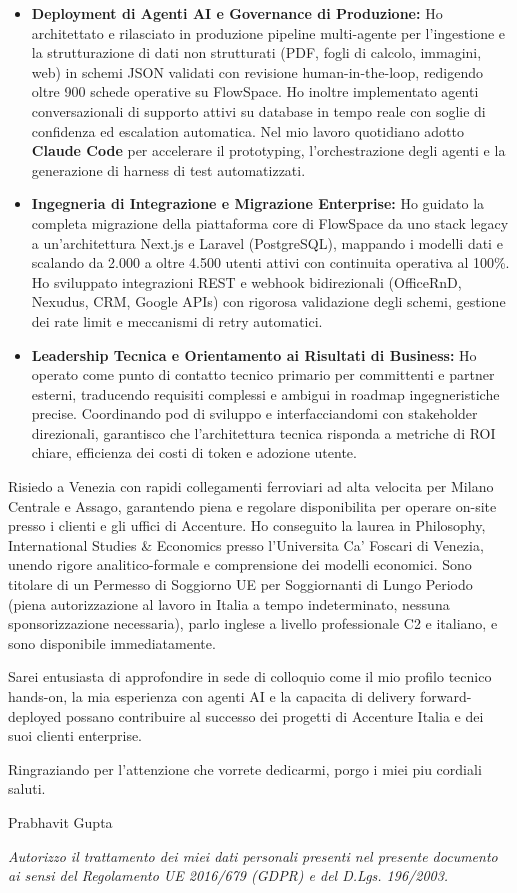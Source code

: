 \documentclass[10.5pt,a4paper]{article}
\begin{document}
\begin{itemize}
  \setlength{\itemsep}{1.5pt}
  \setlength{\parskip}{0pt}
  \item \textbf{Deployment di Agenti AI e Governance di Produzione:} Ho architettato e rilasciato in produzione pipeline multi-agente per l'ingestione e la strutturazione di dati non strutturati (PDF, fogli di calcolo, immagini, web) in schemi JSON validati con revisione human-in-the-loop, redigendo oltre 900 schede operative su FlowSpace. Ho inoltre implementato agenti conversazionali di supporto attivi su database in tempo reale con soglie di confidenza ed escalation automatica. Nel mio lavoro quotidiano adotto \textbf{Claude Code} per accelerare il prototyping, l'orchestrazione degli agenti e la generazione di harness di test automatizzati.
  \item \textbf{Ingegneria di Integrazione e Migrazione Enterprise:} Ho guidato la completa migrazione della piattaforma core di FlowSpace da uno stack legacy a un'architettura Next.js e Laravel (PostgreSQL), mappando i modelli dati e scalando da 2.000 a oltre 4.500 utenti attivi con continuita operativa al 100\%. Ho sviluppato integrazioni REST e webhook bidirezionali (OfficeRnD, Nexudus, CRM, Google APIs) con rigorosa validazione degli schemi, gestione dei rate limit e meccanismi di retry automatici.
  \item \textbf{Leadership Tecnica e Orientamento ai Risultati di Business:} Ho operato come punto di contatto tecnico primario per committenti e partner esterni, traducendo requisiti complessi e ambigui in roadmap ingegneristiche precise. Coordinando pod di sviluppo e interfacciandomi con stakeholder direzionali, garantisco che l'architettura tecnica risponda a metriche di ROI chiare, efficienza dei costi di token e adozione utente.
\end{itemize}

Risiedo a Venezia con rapidi collegamenti ferroviari ad alta velocita per Milano Centrale e Assago, garantendo piena e regolare disponibilita per operare on-site presso i clienti e gli uffici di Accenture. Ho conseguito la laurea in Philosophy, International Studies \& Economics presso l'Universita Ca' Foscari di Venezia, unendo rigore analitico-formale e comprensione dei modelli economici. Sono titolare di un Permesso di Soggiorno UE per Soggiornanti di Lungo Periodo (piena autorizzazione al lavoro in Italia a tempo indeterminato, nessuna sponsorizzazione necessaria), parlo inglese a livello professionale C2 e italiano, e sono disponibile immediatamente.

Sarei entusiasta di approfondire in sede di colloquio come il mio profilo tecnico hands-on, la mia esperienza con agenti AI e la capacita di delivery forward-deployed possano contribuire al successo dei progetti di Accenture Italia e dei suoi clienti enterprise.

Ringraziando per l'attenzione che vorrete dedicarmi, porgo i miei piu cordiali saluti.

Prabhavit Gupta

\vspace{0.4em}
{\footnotesize \textit{Autorizzo il trattamento dei miei dati personali presenti nel presente documento ai sensi del Regolamento UE 2016/679 (GDPR) e del D.Lgs. 196/2003.}\par}
\end{document}
